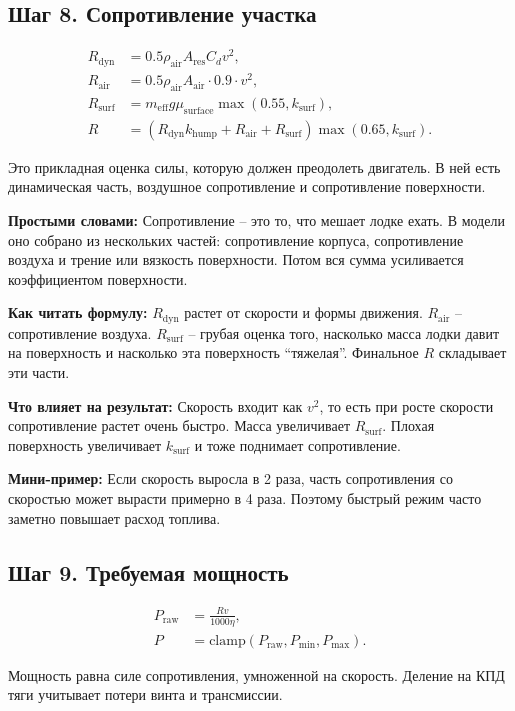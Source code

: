 \documentclass[12pt,a4paper]{article}
\newcommand{\simple}[1]{\par\smallskip\noindent\textbf{Простыми словами:} #1\par}
\newcommand{\howto}[1]{\par\smallskip\noindent\textbf{Как читать формулу:} #1\par}
\newcommand{\effect}[1]{\par\smallskip\noindent\textbf{Что влияет на результат:} #1\par}
\newcommand{\exampletext}[1]{\par\smallskip\noindent\textbf{Мини-пример:} #1\par}
\begin{document}
\subsection{Шаг 8. Сопротивление участка}

\begin{align}
R_{\mathrm{dyn}} &=
0.5 \rho_{\mathrm{air}} A_{\mathrm{res}} C_d v^2, \\
R_{\mathrm{air}} &=
0.5 \rho_{\mathrm{air}} A_{\mathrm{air}} \cdot 0.9 \cdot v^2, \\
R_{\mathrm{surf}} &=
m_{\mathrm{eff}}g\mu_{\mathrm{surface}}\max(0.55,k_{\mathrm{surf}}), \\
R &=
\left(R_{\mathrm{dyn}}k_{\mathrm{hump}} + R_{\mathrm{air}} + R_{\mathrm{surf}}\right)
\max(0.65,k_{\mathrm{surf}}).
\end{align}

Это прикладная оценка силы, которую должен преодолеть двигатель. В ней есть
динамическая часть, воздушное сопротивление и сопротивление поверхности.

\simple{Сопротивление -- это то, что мешает лодке ехать. В модели оно собрано
из нескольких частей: сопротивление корпуса, сопротивление воздуха и трение или
вязкость поверхности. Потом вся сумма усиливается коэффициентом поверхности.}
\howto{\(R_{\mathrm{dyn}}\) растет от скорости и формы движения.
\(R_{\mathrm{air}}\) -- сопротивление воздуха. \(R_{\mathrm{surf}}\) -- грубая
оценка того, насколько масса лодки давит на поверхность и насколько эта
поверхность ``тяжелая''. Финальное \(R\) складывает эти части.}
\effect{Скорость входит как \(v^2\), то есть при росте скорости сопротивление
растет очень быстро. Масса увеличивает \(R_{\mathrm{surf}}\). Плохая
поверхность увеличивает \(k_{\mathrm{surf}}\) и тоже поднимает сопротивление.}
\exampletext{Если скорость выросла в 2 раза, часть сопротивления со скоростью
может вырасти примерно в 4 раза. Поэтому быстрый режим часто заметно повышает
расход топлива.}

\subsection{Шаг 9. Требуемая мощность}

\begin{align}
P_{\mathrm{raw}} &= \frac{Rv}{1000\eta}, \\
P &= \mathrm{clamp}\left(P_{\mathrm{raw}}, P_{\min}, P_{\max}\right).
\end{align}

Мощность равна силе сопротивления, умноженной на скорость. Деление на КПД тяги
учитывает потери винта и трансмиссии.
\end{document}
